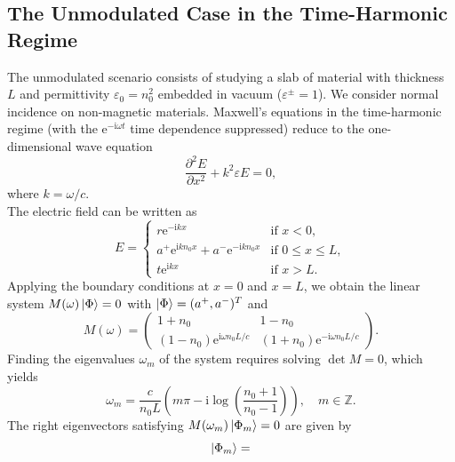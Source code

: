 \documentclass[%
 reprint,
 amsmath,amssymb,
 aps,
 prb,
]{revtex4-2}
\newcommand{\corrections}[1]{#1}
\begin{document}
\begin{appendix}


\section{The Unmodulated Case \corrections{in the Time-Harmonic Regime}}
\label{sec:static}

The unmodulated scenario consists of studying a slab of material with thickness $L$ and permittivity $\varepsilon_0 = n_0^2$ embedded in vacuum ($\varepsilon^\pm=1$). We consider normal incidence on non-magnetic materials. Maxwell's equations in the time-harmonic regime (with the $\mathrm{e}^{-\mathrm{i} \omega t}$ time dependence suppressed) reduce to the one-dimensional wave equation
\begin{equation}
\frac{\partial^2 E}{\partial x^2} + k^2 \varepsilon E = 0,
\end{equation}
where $k=\omega/c$.\\
The electric field can be written as
\begin{equation}
E =
\begin{cases}
r\mathrm{e}^{-\mathrm{i} k x} & \text{if } x<0, \\
a^+\mathrm{e}^{\mathrm{i} k n_0 x} + a^-\mathrm{e}^{-\mathrm{i} k n_0 x} & \text{if } 0\leq x \leq L, \\
t\mathrm{e}^{\mathrm{i} k x} & \text{if } x>L.
\end{cases}
\end{equation}
Applying the boundary conditions at $x =0$ and $x=L$, we obtain the linear system $M(\omega) \ket{\Phi} = 0$ with $\ket{\Phi} = (a^+, a^-)^T$ and
\begin{equation}
M(\omega) =
\begin{pmatrix}
1+n_0 & 1-n_0 \\
(1-n_0) \mathrm{e}^{\mathrm{i} \omega n_0 L/c} & (1+n_0) \mathrm{e}^{-\mathrm{i} \omega n_0 L/c}
\end{pmatrix}.
\end{equation}
Finding the eigenvalues $\omega_m$ of the system requires solving $\det M = 0$, which yields \cite{muljarov2011}
\begin{equation}
\omega_m = \frac{c}{n_0 L} \left(m\pi - \mathrm{i} \log\left(\frac{n_0+1}{n_0-1}\right)\right), \quad m \in \mathbb{Z}.
\label{eq:evs_slab_static}
\end{equation}
The right eigenvectors satisfying $M(\omega_m)\ket{\Phi_m} = 0$ are given by
\begin{equation}
\ket{\Phi_m} =

\end{equation}
\end{appendix}
\end{document}
